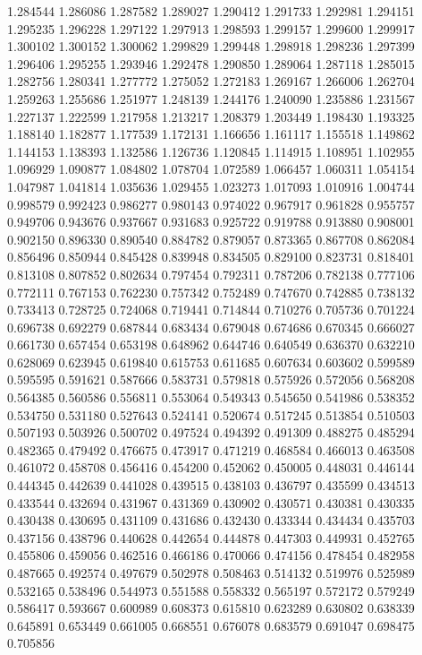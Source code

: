 1.284544
1.286086
1.287582
1.289027
1.290412
1.291733
1.292981
1.294151
1.295235
1.296228
1.297122
1.297913
1.298593
1.299157
1.299600
1.299917
1.300102
1.300152
1.300062
1.299829
1.299448
1.298918
1.298236
1.297399
1.296406
1.295255
1.293946
1.292478
1.290850
1.289064
1.287118
1.285015
1.282756
1.280341
1.277772
1.275052
1.272183
1.269167
1.266006
1.262704
1.259263
1.255686
1.251977
1.248139
1.244176
1.240090
1.235886
1.231567
1.227137
1.222599
1.217958
1.213217
1.208379
1.203449
1.198430
1.193325
1.188140
1.182877
1.177539
1.172131
1.166656
1.161117
1.155518
1.149862
1.144153
1.138393
1.132586
1.126736
1.120845
1.114915
1.108951
1.102955
1.096929
1.090877
1.084802
1.078704
1.072589
1.066457
1.060311
1.054154
1.047987
1.041814
1.035636
1.029455
1.023273
1.017093
1.010916
1.004744
0.998579
0.992423
0.986277
0.980143
0.974022
0.967917
0.961828
0.955757
0.949706
0.943676
0.937667
0.931683
0.925722
0.919788
0.913880
0.908001
0.902150
0.896330
0.890540
0.884782
0.879057
0.873365
0.867708
0.862084
0.856496
0.850944
0.845428
0.839948
0.834505
0.829100
0.823731
0.818401
0.813108
0.807852
0.802634
0.797454
0.792311
0.787206
0.782138
0.777106
0.772111
0.767153
0.762230
0.757342
0.752489
0.747670
0.742885
0.738132
0.733413
0.728725
0.724068
0.719441
0.714844
0.710276
0.705736
0.701224
0.696738
0.692279
0.687844
0.683434
0.679048
0.674686
0.670345
0.666027
0.661730
0.657454
0.653198
0.648962
0.644746
0.640549
0.636370
0.632210
0.628069
0.623945
0.619840
0.615753
0.611685
0.607634
0.603602
0.599589
0.595595
0.591621
0.587666
0.583731
0.579818
0.575926
0.572056
0.568208
0.564385
0.560586
0.556811
0.553064
0.549343
0.545650
0.541986
0.538352
0.534750
0.531180
0.527643
0.524141
0.520674
0.517245
0.513854
0.510503
0.507193
0.503926
0.500702
0.497524
0.494392
0.491309
0.488275
0.485294
0.482365
0.479492
0.476675
0.473917
0.471219
0.468584
0.466013
0.463508
0.461072
0.458708
0.456416
0.454200
0.452062
0.450005
0.448031
0.446144
0.444345
0.442639
0.441028
0.439515
0.438103
0.436797
0.435599
0.434513
0.433544
0.432694
0.431967
0.431369
0.430902
0.430571
0.430381
0.430335
0.430438
0.430695
0.431109
0.431686
0.432430
0.433344
0.434434
0.435703
0.437156
0.438796
0.440628
0.442654
0.444878
0.447303
0.449931
0.452765
0.455806
0.459056
0.462516
0.466186
0.470066
0.474156
0.478454
0.482958
0.487665
0.492574
0.497679
0.502978
0.508463
0.514132
0.519976
0.525989
0.532165
0.538496
0.544973
0.551588
0.558332
0.565197
0.572172
0.579249
0.586417
0.593667
0.600989
0.608373
0.615810
0.623289
0.630802
0.638339
0.645891
0.653449
0.661005
0.668551
0.676078
0.683579
0.691047
0.698475
0.705856
